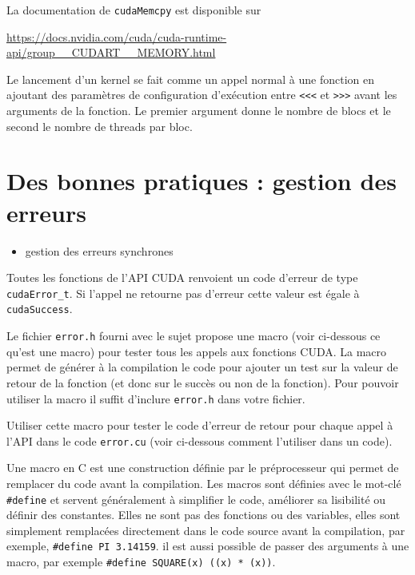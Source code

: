 \begin{howto}{}
La documentation de {\tt cudaMemcpy} est disponible sur

\url{https://docs.nvidia.com/cuda/cuda-runtime-api/group__CUDART__MEMORY.html}
\end{howto} 

\begin{howto}{}
Le lancement d'un kernel se fait comme un appel normal à une fonction en ajoutant des paramètres de configuration d'exécution entre {\tt {<}{<}{<}} et {\tt {>}{>}{>}} avant les arguments de la fonction. Le premier argument donne le nombre de blocs et le second le nombre de threads par bloc.
\end{howto} 

\newpage
  \section{Des bonnes pratiques : gestion des erreurs}

\begin{objectif}[]{}
 \begin{itemize}
	\item gestion des erreurs synchrones
\end{itemize}
\end{objectif}

\begin{wtodo}{}

Toutes les fonctions de l'API CUDA renvoient un code d'erreur de type {\tt cudaError\_t}. Si l'appel ne retourne pas d'erreur cette valeur est égale à {\tt cudaSuccess}.

Le fichier {\tt error.h} fourni avec le sujet propose une macro (voir ci-dessous ce qu'est une macro) pour tester tous les appels aux fonctions CUDA. La macro permet de générer à la compilation le code pour ajouter un test sur la valeur de retour de la fonction (et donc sur le succès ou non de la fonction). Pour pouvoir utiliser la macro il suffit d'inclure {\tt error.h} dans votre fichier.

Utiliser cette macro pour tester le code d'erreur de retour pour chaque appel à l'API dans le code {\tt error.cu} (voir ci-dessous comment l'utiliser dans un code).
\end{wtodo}


\begin{howto}{}
Une macro en C est une construction définie par le préprocesseur qui permet de remplacer du code avant la compilation. Les macros sont définies avec le mot-clé {\tt \#define} et servent généralement à simplifier le code, améliorer sa lisibilité ou définir des constantes. Elles ne sont pas des fonctions ou des variables, elles sont simplement remplacées directement dans le code source avant la compilation, par exemple, {\tt \#define PI 3.14159}. il est aussi possible de passer des arguments à une macro, par exemple {\tt \#define SQUARE(x) ((x) * (x))}.
\end{howto} 

